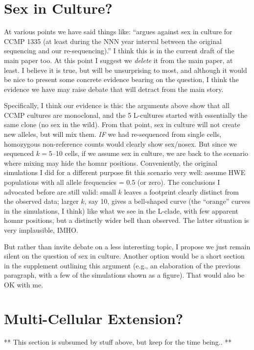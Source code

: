 \documentclass{article}\usepackage[]{graphicx}\usepackage[]{color}
\begin{document}
\section{Sex in Culture?}

At various points we have said things like:
  ``argues against sex in culture for CCMP 1335 (at
  least during the NNN year interval between the
  original sequencing\cite{Armbrust04} and our re-sequencing).''
I think this is in the current draft of the main paper too.  At this point I suggest we \emph{delete} it from the main paper, at least.  I believe it is true, but will be unsurprising to most, and although it would be nice to present some concrete evidence bearing on the question, I think the evidence we have may raise debate that will detract from the main story.  

Specifically, I think our evidence is this: the arguments above show that all CCMP cultures are monoclonal, and the 5 L-cultures started with essentially the same clone (no sex in the wild).  From that point, sex in culture will not create new alleles, but will mix them.  \emph{IF} we had re-sequenced from single cells, homozygous non-reference counts would clearly show sex/nosex.  But since we sequenced $k=5$--10 cells, if we assume sex in culture, we are back to the scenario where mixing may hide the homnr positions.  Conveniently, the original simulations I did for a different purpose fit this scenario very well:  assume  HWE populations with all allele frequencies = 0.5 (or zero).  The conclusions I advocated before are still valid: small $k$ leaves a footprint clearly distinct from the observed data; larger $k$, say 10, gives a bell-shaped curve (the ``orange'' curves in the simulations, I think) like what we see in the L-clade, with few apparent homnr positions, but a distinctly wider bell than observed.  The latter situation is very implausible, IMHO.  

But rather than invite debate on a less interesting topic, I propose we just remain silent on the question of sex in culture.  Another option would be a short section in the supplement outlining this argument (e.g., an elaboration of the previous paragraph, with a few of the simulations shown as a figure).  That would also be OK with me.
\fi

\iffalse
\section{Multi-Cellular Extension?}

** This section is subsumed by stuff above, but keep for the time being.. **
\end{document}
